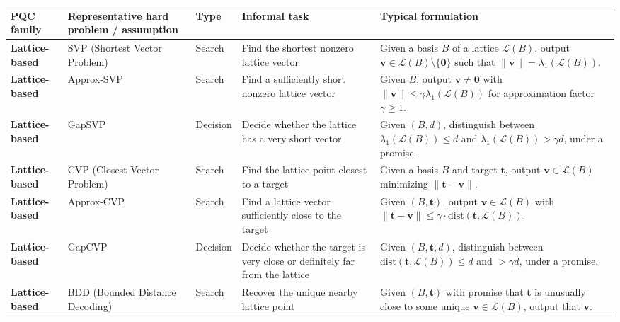 \documentclass[11pt]{article}
\begin{document}
	\begin{center}
		\scriptsize
		\renewcommand{\arraystretch}{1.35}
		\begin{tabular}{|p{1.9cm}|p{2.9cm}|p{3.3cm}|p{4.4cm}|p{4.8cm}|}
			\hline
			\textbf{PQC family} & \textbf{Representative hard problem / assumption} & \textbf{Type} & \textbf{Informal task} & \textbf{Typical formulation} \\
			\hline
			
			\textbf{Lattice-based} 
			& SVP (Shortest Vector Problem) 
			& Search 
			& Find the shortest nonzero lattice vector 
			& Given a basis $B$ of a lattice $\mathcal{L}(B)$, output $\bm v \in \mathcal{L}(B)\setminus\{\bm 0\}$ such that $\|\bm v\|=\lambda_1(\mathcal{L}(B))$. \\
			\hline
			
			\textbf{Lattice-based} 
			& Approx-SVP 
			& Search 
			& Find a sufficiently short nonzero lattice vector 
			& Given $B$, output $\bm v \neq \bm 0$ with $\|\bm v\| \le \gamma \lambda_1(\mathcal{L}(B))$ for approximation factor $\gamma \ge 1$. \\
			\hline
			
			\textbf{Lattice-based} 
			& GapSVP 
			& Decision 
			& Decide whether the lattice has a very short vector 
			& Given $(B,d)$, distinguish between $\lambda_1(\mathcal{L}(B)) \le d$ and $\lambda_1(\mathcal{L}(B)) > \gamma d$, under a promise. \\
			\hline
			
			\textbf{Lattice-based} 
			& CVP (Closest Vector Problem) 
			& Search 
			& Find the lattice point closest to a target 
			& Given a basis $B$ and target $\bm t$, output $\bm v \in \mathcal{L}(B)$ minimizing $\|\bm t-\bm v\|$. \\
			\hline
			
			\textbf{Lattice-based} 
			& Approx-CVP 
			& Search 
			& Find a lattice vector sufficiently close to the target 
			& Given $(B,\bm t)$, output $\bm v \in \mathcal{L}(B)$ with $\|\bm t-\bm v\| \le \gamma \cdot \mathrm{dist}(\bm t,\mathcal{L}(B))$. \\
			\hline
			
			\textbf{Lattice-based} 
			& GapCVP 
			& Decision 
			& Decide whether the target is very close or definitely far from the lattice 
			& Given $(B,\bm t,d)$, distinguish between $\mathrm{dist}(\bm t,\mathcal{L}(B)) \le d$ and $> \gamma d$, under a promise. \\
			\hline
			
			\textbf{Lattice-based} 
			& BDD (Bounded Distance Decoding) 
			& Search 
			& Recover the unique nearby lattice point 
			& Given $(B,\bm t)$ with promise that $\bm t$ is unusually close to some unique $\bm v \in \mathcal{L}(B)$, output that $\bm v$. \\
			\hline
			

\end{tabular}
\end{center}
\end{document}
